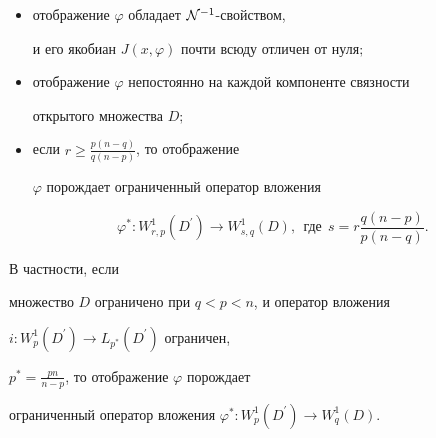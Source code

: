 \begin{thm}
\begin{itemize}
$$


\|\varphi^{\ast}:L_r(A^{\prime})\to L_s(\varphi^{-1}(A^{\prime}))\|\leq


\|H_q(\cdot)\mid L_\varkappa(A^{\prime})\|^{\frac{pn}{r(n-p)}};


$$


\item[4)] отображение $\varphi$ обладает ${\cal N}^{-1}$-свойством,


и его якобиан $J(x,\varphi)$ почти всюду отличен от нуля\/$;$


\item[5)]


отображение $\varphi$ непостоянно на каждой компоненте связности


открытого множества $D;$


\item[6)]


если $r\geq \frac{p(n-q)}{q(n-p)}$, то отображение


$\varphi$ порождает ограниченный оператор вложения


$$


\varphi^{\ast}: W^1_{r,p}(D^{\prime})\to W^1_{s,q}(D),


\ \ \text{где} \ \ s=r \frac{q(n-p)}{p(n-q)}.


$$


\end{itemize}


В частности, если


множество $D$ ограничено при $q<p<n$, и оператор вложения


$i:W^1_p(D^{\prime})\to L_{p^*}(D^{\prime})$ ограничен,


$p^*=\frac{pn}{n-p}$, то отображение $\varphi$ порождает


ограниченный оператор вложения $\varphi^{\ast}:


W^1_p(D^{\prime})\to W^1_{q}(D)$.


\end{thm}





